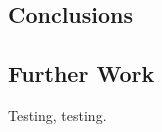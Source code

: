 \documentclass[../thesis/thesis.tex]{subfiles}
\begin{document}
\begin{refsection}
\chapter{Conclusions}
\section{Further Work}
Testing, testing\cite{Stant_2016_Coll, Stant_2016}.
\printbibliography
\end{refsection}
\end{document}
